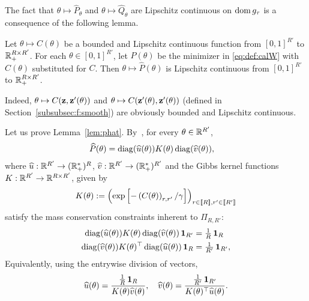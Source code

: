 The     fact     that     $\theta    \mapsto     \widehat{P}_{\theta}$     and
$\theta\mapsto    \widehat{Q}_{\theta}$    are   Lipschitz    continuous    on
$\operatorname{dom} g_{\tau}$ is a consequence of the following lemma.
\begin{lemma}
  \label{lem:phat}
  Let  $\theta  \mapsto  C(\theta)$  be a  bounded  and  Lipschitz  continuous
  function   from  $[0,1]^{R'}$   to   $\mathbb{R}_{+}^{R\times   R'}$.   For   each
  $\theta\in[0,1]^{R'}$,  let   $\widehat{P}(\theta)$  be  the   minimizer  in
  \eqref{eq:def:calW}   with   $C(\theta)$    substituted   for   $C$.    Then
  $\theta   \mapsto   \widehat{P}(\theta)$   is  Lipschitz   continuous   from
  $[0,1]^{R'}$ to $\mathbb{R}_{+}^{R\times R'}$.
\end{lemma}
\noindent      Indeed,       $\theta\mapsto      C(\textbf{z},\textbf{z}'(\theta))$      and
$\theta\mapsto        C(\textbf{z}'(\theta),\textbf{z}'(\theta))$         (defined        in
Section~\ref{subsubsec:f:smooth})   are   obviously  bounded   and   Lipschitz
continuous.

Let       us      prove       Lemma~\ref{lem:phat}.       By~\cite[Proposition
4.3]{pmlr-v32-cuturi14}, for every $\theta \in \mathbb{R}^{R'}$,
\begin{align*}
  \widehat{P}(\theta)
  & = \operatorname{diag}(\widehat{u}(\theta)) K(\theta)
    \operatorname{diag}(\widehat{v}(\theta)),
\end{align*}
where    $\widehat{u}    :    \mathbb{R}^{R'}    \rightarrow    (\mathbb{R}_{+}^{*})^{R}$,
$\widehat{v} : \mathbb{R}^{R'} \rightarrow (\mathbb{R}_{+}^{*})^{R'}$ and the Gibbs kernel
functions $K: \mathbb{R}^{R'} \to \mathbb{R}^{R \times R'}$, given by
\begin{equation*}
  K(\theta)                 :=                \left(\exp\left[-\left(C(\theta)
      \right)_{r,r'}/\gamma\right]\right)_{r \in \llbracket R \rrbracket, r' \in \llbracket
    R' \rrbracket}
\end{equation*}
satisfy the mass conservation constraints inherent to $\Pi_{R,R'}$:
\begin{align}
  \label{eq:conserv:a}
  \operatorname{diag}(\widehat{u}(\theta)) K(\theta) \operatorname{diag}(\widehat{v}(\theta))
  \operatorname{\textbf{1}}_{R'}
  &=\tfrac{1}{R}\operatorname{\textbf{1}}_{R}\\
  \label{eq:conserv:b}
  \operatorname{diag}(\widehat{v}(\theta))    K(\theta)^{\top}    \operatorname{diag}(\widehat{u}(\theta))
  \operatorname{\textbf{1}}_{R}
  &= \tfrac{1}{R'} \operatorname{\textbf{1}}_{R'},
\end{align}
Equivalently, using the entrywise division of vectors,
\begin{equation}
  \label{eq:conserv:c}
  \widehat{u}(\theta)        =        \frac{\tfrac{1}{R}\operatorname{\textbf{1}}_{R}}{K(\theta)
    \widehat{v}(\theta)},
  \quad
  \widehat{v}(\theta)     =\frac{\tfrac{1}{R'}\operatorname{\textbf{1}}_{R'}}{     K(\theta)^{\top}
    \widehat{u}(\theta)}. 
\end{equation}


